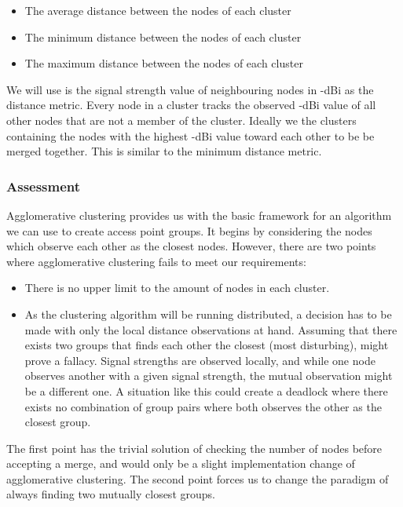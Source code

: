 \begin{itemize}
	\itemsep0em 
	\item The average distance between the nodes of each cluster
	\item The minimum distance between the nodes of each cluster
	\item The maximum distance between the nodes of each cluster
\end{itemize}

We will use is the signal strength value of neighbouring nodes in -dBi as the distance metric.
Every node in a cluster tracks the observed -dBi value of all other nodes that are not a member of the cluster.
Ideally we the clusters containing the nodes with the highest -dBi value toward each other to be be merged together. This is similar to the minimum distance metric. 

\subsubsection{Assessment}
Agglomerative clustering provides us with the basic framework for an algorithm we can use to create access point groups. It begins by considering the nodes which
observe each other as the closest nodes. However, there are two points where agglomerative clustering fails to meet our requirements: 

\begin{itemize}
	\item There is no upper limit to the amount of nodes in each cluster.
	\item As the clustering algorithm will be running distributed, a decision has to be made with only the local distance observations at hand.
		Assuming that there exists two groups that finds each other the closest (most disturbing), might prove a fallacy. Signal strengths are observed locally, and while one node observes another with a given signal strength, the mutual observation might be a different one. A situation like this could create a deadlock where there exists no combination of group pairs where both observes the other
		as the closest group. 
\end{itemize}

The first point has the trivial solution of checking the number of nodes before accepting a merge,  and would only be a slight implementation change of agglomerative clustering. 
The second point forces us to change the paradigm of always finding two mutually closest groups. 

